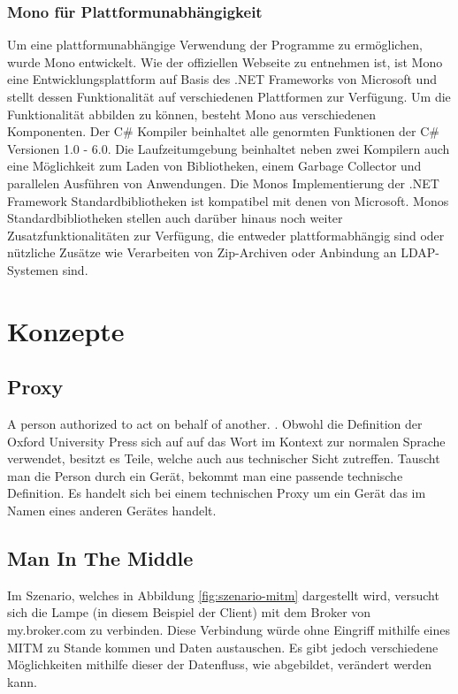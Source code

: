     \subsubsection{Mono für Plattformunabhängigkeit}
        Um eine plattformunabhängige Verwendung der Programme zu ermöglichen, wurde Mono entwickelt.
        Wie der offiziellen Webseite \cite{mono_project_2018} zu entnehmen ist, ist Mono eine Entwicklungsplattform auf Basis des .NET Frameworks von Microsoft und stellt dessen Funktionalität auf verschiedenen Plattformen zur Verfügung. Um die Funktionalität abbilden zu können, besteht Mono aus verschiedenen Komponenten.
        Der C\# Kompiler beinhaltet alle genormten Funktionen der C\# Versionen 1.0 - 6.0.
        Die Laufzeitumgebung beinhaltet neben zwei Kompilern auch eine Möglichkeit zum Laden von Bibliotheken, einem Garbage Collector und parallelen Ausführen von Anwendungen.
        Die Monos Implementierung der .NET Framework Standardbibliotheken ist kompatibel mit denen von Microsoft.
        Monos Standardbibliotheken stellen auch darüber hinaus noch weiter Zusatzfunktionalitäten zur Verfügung, die entweder plattformabhängig sind oder nützliche Zusätze wie Verarbeiten von Zip-Archiven oder Anbindung an LDAP-Systemen sind.

\section{Konzepte}
    \subsection{Proxy}
    \glqq A person authorized to act on behalf of another.\grqq{} \cite{oxford_university_press_2019}.
    Obwohl die Definition der Oxford University Press sich auf auf das Wort im Kontext zur normalen Sprache verwendet, besitzt es Teile, welche auch aus technischer Sicht zutreffen. Tauscht man die Person durch ein Gerät, bekommt man eine passende technische Definition. Es handelt sich bei einem technischen Proxy um ein Gerät das im Namen eines anderen Gerätes handelt.

    \subsection{Man In The Middle}
        Im Szenario, welches in Abbildung \ref{fig:szenario-mitm} dargestellt wird, versucht sich die Lampe (in diesem Beispiel der Client) mit dem Broker von \glqq my.broker.com\grqq{} zu verbinden. Diese Verbindung würde ohne Eingriff mithilfe eines \ac{MITM} zu Stande kommen und Daten austauschen. Es gibt jedoch verschiedene Möglichkeiten mithilfe dieser der Datenfluss, wie abgebildet, verändert werden kann.
